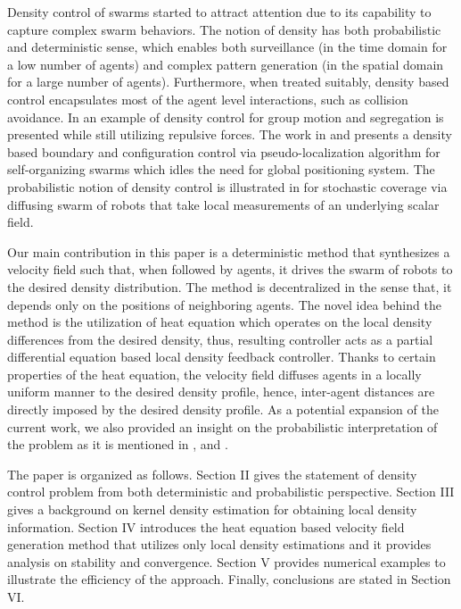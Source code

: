 \documentclass{ifacconf}
\begin{document}
Density control of swarms started to attract attention due to its capability to capture complex swarm behaviors. The notion of density has both probabilistic and deterministic sense, which enables both surveillance (in the time domain for a low number of agents) and complex pattern generation (in the spatial domain for a large number of agents). Furthermore, when treated suitably, density based control encapsulates most of the agent level interactions, such as collision avoidance. In \cite{zhao2011density} an example of density control for group motion and segregation is presented while still utilizing repulsive forces. The work in \cite{krishnan2016self} and \cite{krishnan2017distributed} presents a density based boundary and configuration control via pseudo-localization algorithm for self-organizing swarms which idles the need for global positioning system. The probabilistic notion of density control is illustrated in \cite{elamvazhuthi2016coverage} for stochastic coverage via diffusing swarm of robots that take local measurements of an underlying scalar field.

Our main contribution in this paper is a deterministic method that synthesizes a velocity field such that, when followed by agents, it drives the swarm of robots to the desired density distribution. The method is decentralized in the sense that, it depends only on the positions of neighboring agents. The novel idea behind the method is the utilization of heat equation which operates on the local density differences from the desired density, thus, resulting controller acts as a partial differential equation based local density feedback controller. Thanks to certain properties of the heat equation, the velocity field diffuses agents in a locally uniform manner to the desired density profile, hence, inter-agent distances are directly imposed by the desired density profile. As a potential expansion of the current work, we also provided an insight on the probabilistic interpretation of the problem as it is mentioned in \cite{hamann2008framework},\cite{elamvazhuthi2016coverage} and \cite{berman2011design}.

The paper is organized as follows. Section II gives the statement of density control problem from both deterministic and probabilistic perspective. Section III gives a background on kernel density estimation for obtaining local density information. Section IV introduces the heat equation based velocity field generation method that utilizes only local density estimations and it provides analysis on stability and convergence. Section V provides numerical examples to illustrate the efficiency of the approach. Finally, conclusions are stated in Section VI.
\end{document}
